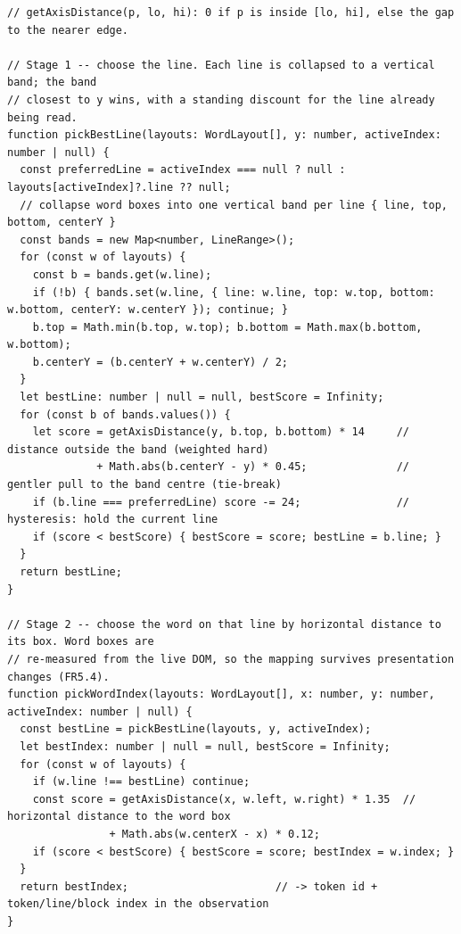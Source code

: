 \begin{listing}[htbp]
\begin{verbatim}
// getAxisDistance(p, lo, hi): 0 if p is inside [lo, hi], else the gap to the nearer edge.

// Stage 1 -- choose the line. Each line is collapsed to a vertical band; the band
// closest to y wins, with a standing discount for the line already being read.
function pickBestLine(layouts: WordLayout[], y: number, activeIndex: number | null) {
  const preferredLine = activeIndex === null ? null : layouts[activeIndex]?.line ?? null;
  // collapse word boxes into one vertical band per line { line, top, bottom, centerY }
  const bands = new Map<number, LineRange>();
  for (const w of layouts) {
    const b = bands.get(w.line);
    if (!b) { bands.set(w.line, { line: w.line, top: w.top, bottom: w.bottom, centerY: w.centerY }); continue; }
    b.top = Math.min(b.top, w.top); b.bottom = Math.max(b.bottom, w.bottom);
    b.centerY = (b.centerY + w.centerY) / 2;
  }
  let bestLine: number | null = null, bestScore = Infinity;
  for (const b of bands.values()) {
    let score = getAxisDistance(y, b.top, b.bottom) * 14     // distance outside the band (weighted hard)
              + Math.abs(b.centerY - y) * 0.45;              // gentler pull to the band centre (tie-break)
    if (b.line === preferredLine) score -= 24;               // hysteresis: hold the current line
    if (score < bestScore) { bestScore = score; bestLine = b.line; }
  }
  return bestLine;
}

// Stage 2 -- choose the word on that line by horizontal distance to its box. Word boxes are
// re-measured from the live DOM, so the mapping survives presentation changes (FR5.4).
function pickWordIndex(layouts: WordLayout[], x: number, y: number, activeIndex: number | null) {
  const bestLine = pickBestLine(layouts, y, activeIndex);
  let bestIndex: number | null = null, bestScore = Infinity;
  for (const w of layouts) {
    if (w.line !== bestLine) continue;
    const score = getAxisDistance(x, w.left, w.right) * 1.35  // horizontal distance to the word box
                + Math.abs(w.centerX - x) * 0.12;
    if (score < bestScore) { bestScore = score; bestIndex = w.index; }
  }
  return bestIndex;                       // -> token id + token/line/block index in the observation
}
\end{verbatim}
\caption{Gaze-to-content mapping (abbreviated from \texttt{useGazeTokenHighlight.ts}). \texttt{pickBestLine} scores lines by weighted vertical distance; \texttt{pickWordIndex} picks the nearest word on the chosen line. Layout index rebuilt from the live DOM on every mutation, resize, and scroll.}
\label{lst:impl-tokenmap}
\end{listing}


